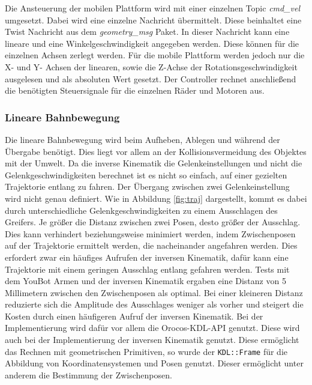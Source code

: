 Die Ansteuerung der mobilen Plattform wird mit einer einzelnen Topic \textit{cmd\_vel} umgesetzt. Dabei wird eine einzelne Nachricht übermittelt. Diese beinhaltet eine Twist Nachricht aus dem \textit{geometry\_msg} Paket. In dieser Nachricht kann eine lineare und eine Winkelgeschwindigkeit angegeben werden. Diese können für die einzelnen Achsen zerlegt werden. Für die mobile Plattform werden jedoch nur die X- und Y- Achsen der linearen, sowie die Z-Achse der Rotationsgeschwindigkeit ausgelesen und als absoluten Wert gesetzt. Der Controller rechnet anschließend die benötigten Steuersignale für die einzelnen Räder und Motoren aus.

\subsubsection{Lineare Bahnbewegung}
\label{sec:impl-res-lb}
Die lineare Bahnbewegung wird beim Aufheben, Ablegen und während der Übergabe benötigt. Dies liegt vor allem an der Kollisionsvermeidung des Objektes mit der Umwelt. Da die inverse Kinematik die Gelenkeinstellungen und nicht die Gelenkgeschwindigkeiten berechnet ist es nicht so einfach, auf einer gezielten Trajektorie entlang zu fahren. Der Übergang zwischen zwei Gelenkeinstellung wird nicht genau definiert. Wie in Abbildung \ref{fig:traj} dargestellt, kommt es dabei durch unterschiedliche Gelenkgeschwindigkeiten zu einem Ausschlagen des Greifers. Je größer die Distanz zwischen zwei Posen, desto größer der Ausschlag. Dies kann verhindert beziehungsweise minimiert werden, indem Zwischenposen auf der Trajektorie ermittelt werden, die nacheinander angefahren werden. Dies erfordert zwar ein häufiges Aufrufen der inversen Kinematik, dafür kann eine Trajektorie mit einem geringen Ausschlag entlang gefahren werden. Tests mit dem YouBot Armen und der inversen Kinematik ergaben eine Distanz von 5 Millimetern zwischen den Zwischenposen als optimal. Bei einer kleineren Distanz reduzierte sich die Amplitude des Ausschlages weniger als vorher und steigert die Kosten durch einen häufigeren Aufruf der inversen Kinematik. Bei der Implementierung wird dafür vor allem die Orocos-KDL-API genutzt. Diese wird auch bei der Implementierung der inversen Kinematik genutzt. Diese ermöglicht das Rechnen mit geometrischen Primitiven, so wurde der \lstinline|KDL::Frame| für die Abbildung von Koordinatensystemen und Posen genutzt. Dieser ermöglicht unter anderem die Bestimmung der Zwischenposen.

